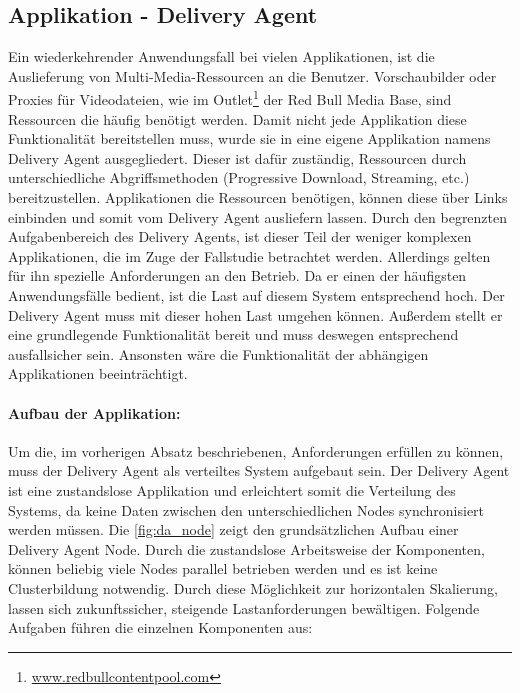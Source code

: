 \subsection{Applikation - Delivery Agent}
\label{sec:deliveryagent}
Ein wiederkehrender Anwendungsfall bei vielen Applikationen, ist die Auslieferung von Multi-Media-Ressourcen an die Benutzer. Vorschaubilder oder Proxies für Videodateien, wie im Outlet\footnote{\url{www.redbullcontentpool.com}} der Red Bull Media Base, sind Ressourcen die häufig benötigt werden. Damit nicht jede Applikation diese Funktionalität bereitstellen muss, wurde sie in eine eigene Applikation namens Delivery Agent ausgegliedert. Dieser ist dafür zuständig, Ressourcen durch unterschiedliche Abgriffsmethoden (Progressive Download, Streaming, etc.) bereitzustellen. Applikationen die Ressourcen benötigen, können diese über Links einbinden und somit vom Delivery Agent ausliefern lassen. Durch den begrenzten Aufgabenbereich des Delivery Agents, ist dieser Teil der weniger komplexen Applikationen, die im Zuge der Fallstudie betrachtet werden. Allerdings gelten für ihn spezielle Anforderungen an den Betrieb. Da er einen der häufigsten Anwendungsfälle bedient, ist die Last auf diesem System entsprechend hoch. Der Delivery Agent muss mit dieser hohen Last umgehen können. Außerdem stellt er eine grundlegende Funktionalität bereit und muss deswegen entsprechend ausfallsicher sein. Ansonsten wäre die Funktionalität der abhängigen Applikationen beeinträchtigt.

\paragraph{Aufbau der Applikation:}
Um die, im vorherigen Absatz beschriebenen, Anforderungen erfüllen zu können, muss der Delivery Agent als verteiltes System aufgebaut sein. Der Delivery Agent ist eine zustandslose Applikation und erleichtert somit die Verteilung des Systems, da keine Daten zwischen den unterschiedlichen Nodes synchronisiert werden müssen. Die \autoref{fig:da_node} zeigt den grundsätzlichen Aufbau einer Delivery Agent Node. Durch die zustandslose Arbeitsweise der Komponenten, können beliebig viele Nodes parallel betrieben werden und es ist keine Clusterbildung notwendig. Durch diese Möglichkeit zur horizontalen Skalierung, lassen sich zukunftssicher, steigende Lastanforderungen bewältigen. Folgende Aufgaben führen die einzelnen Komponenten aus:

